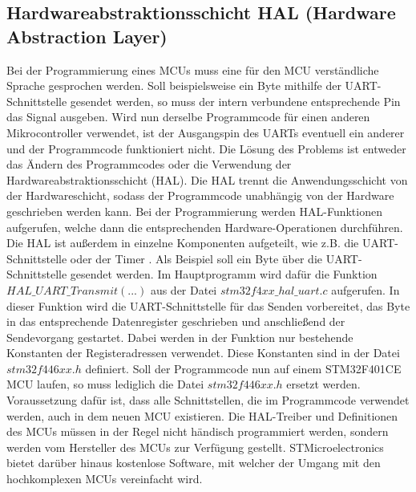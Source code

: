 \subsection{Hardwareabstraktionsschicht HAL (Hardware Abstraction Layer)}
Bei der Programmierung eines MCUs muss eine für den MCU verständliche Sprache gesprochen werden. Soll beispielsweise ein Byte mithilfe der UART-Schnittstelle gesendet werden, so muss der intern verbundene entsprechende Pin das Signal ausgeben. Wird nun derselbe Programmcode für einen anderen Mikrocontroller verwendet, ist der Ausgangspin des UARTs eventuell ein anderer und der Programmcode funktioniert nicht. Die Lösung des Problems ist entweder das Ändern des Programmcodes oder die Verwendung der Hardwareabstraktionsschicht (HAL). Die HAL trennt die Anwendungsschicht von der Hardwareschicht, sodass der Programmcode unabhängig von der Hardware geschrieben werden kann. Bei der Programmierung werden HAL-Funktionen aufgerufen, welche dann die entsprechenden Hardware-Operationen durchführen. Die HAL ist außerdem in einzelne Komponenten aufgeteilt, wie z.B. die UART-Schnittstelle oder der Timer \cite[S.77 ff.]{IoTSystems}. Als Beispiel soll ein Byte über die UART-Schnittstelle gesendet werden. Im Hauptprogramm wird dafür die Funktion $HAL\_UART\_Transmit(...)$ aus der Datei $stm32f4xx\_hal\_uart.c$ aufgerufen. In dieser Funktion wird die UART-Schnittstelle für das Senden vorbereitet, das Byte in das entsprechende Datenregister geschrieben und anschließend der Sendevorgang gestartet. Dabei werden in der Funktion nur bestehende Konstanten der Registeradressen verwendet. Diese Konstanten sind in der Datei $stm32f446xx.h$ definiert. Soll der Programmcode nun auf einem STM32F401CE MCU laufen, so muss lediglich die Datei $stm32f446xx.h$ ersetzt werden. Voraussetzung dafür ist, dass alle Schnittstellen, die im Programmcode verwendet werden, auch in dem neuen MCU existieren. Die HAL-Treiber und Definitionen des MCUs müssen in der Regel nicht händisch programmiert werden, sondern werden vom Hersteller des MCUs zur Verfügung gestellt. STMicroelectronics bietet darüber hinaus kostenlose Software, mit welcher der Umgang mit den hochkomplexen MCUs vereinfacht wird.